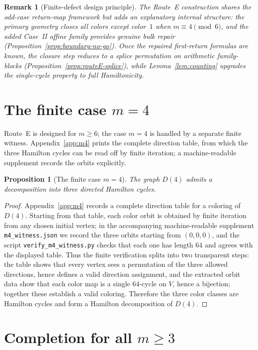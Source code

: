 \documentclass[11pt]{article}
\newtheorem{proposition}{Proposition}
\newtheorem{remark}{Remark}
\begin{document}
\begin{remark}[Finite-defect design principle]
The Route~E construction shares the odd-case return-map framework but adds an explanatory internal structure: the primary geometry closes all colors except color~$1$ when $m\equiv 4\pmod 6$, and the added Case~II affine family provides genuine bulk repair (Proposition~\ref{prop:boundary-no-go}).
Once the repaired first-return formulas are known, the closure step reduces to a splice permutation on arithmetic family-blocks (Proposition~\ref{prop:routeE-splice}), while Lemma~\ref{lem:counting} upgrades the single-cycle property to full Hamiltonicity.
\end{remark}
\section{The finite case $m=4$}\label{sec:m4}

Route~E is designed for $m\ge 6$; the case $m=4$ is handled by a separate finite witness.
Appendix~\ref{app:m4} prints the complete direction table, from which the three Hamilton cycles can be read off by finite iteration; a machine-readable supplement records the orbits explicitly.

\begin{proposition}[The finite case $m=4$]\label{prop:m4-main}
The graph $D(4)$ admits a decomposition into three directed Hamilton cycles.
\end{proposition}

\begin{proof}
Appendix~\ref{app:m4} records a complete direction table for a coloring of $D(4)$.
Starting from that table, each color orbit is obtained by finite iteration from any chosen initial vertex; in the accompanying machine-readable supplement \texttt{m4\_witness.json} we record the three orbits starting from $(0,0,0)$, and the script \texttt{verify\_m4\_witness.py} checks that each one has length $64$ and agrees with the displayed table.
Thus the finite verification splits into two transparent steps: the table shows that every vertex sees a permutation of the three allowed directions, hence defines a valid direction assignment, and the extracted orbit data show that each color map is a single $64$-cycle on $V$, hence a bijection; together these establish a valid coloring.
Therefore the three color classes are Hamilton cycles and form a Hamilton decomposition of $D(4)$.
\end{proof}


\section{Completion for all $m\ge 3$}\label{sec:completion}
\end{document}
